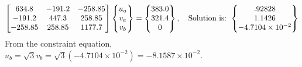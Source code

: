 \begin{example}
{\begin{enumerate}[label=(\arabic*),leftmargin=*]
\begin{align*}
    \end{align*}
    \begin{equation*}
      \begin{bmatrix}634.8 & -191.2 & -258.85\\ -191.2 & 447.3 & 258.85\\ -258.85 & 258.85 & 1177.7\end{bmatrix}\begin{Bmatrix}u_a\\ v_a\\ v_b\end{Bmatrix} = \begin{Bmatrix}383.0\\ 321.4\\ 0\end{Bmatrix},\quad\text{Solution is: }\begin{Bmatrix}.92828\\ 1.1426\\ -4.7104\times10^{-2}\end{Bmatrix}
    \end{equation*}
    From the constraint equation, $u_b = \sqrt3v_b = \sqrt3(-4.7104\times10^{-2}) = -8.1587\times10^{-2}$.
\end{enumerate}

}
\end{example}
